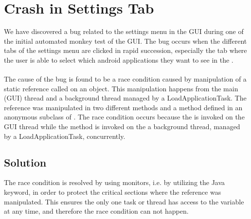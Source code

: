 \section{Crash in Settings Tab}
\label{sec:crash_in_settings_tab}

We have discovered a bug related to the settings menu in the \launcher GUI during one of the initial automated monkey test of the GUI. The bug occurs when the different tabs of the settings menu are clicked in rapid succession, especially the tab where the user is able to select which android applications they want to see in the \giraf \launcher.
\\\\
The cause of the bug is found to be a race condition caused by manipulation of a static reference called  on an  object. This manipulation happens from the main (GUI) thread and a background thread managed by a LoadApplicationTask. The reference was manipulated in two different methods  and a method  defined in an anonymous subclass of . The race condition occurs because the  is invoked on the GUI thread while the  method is invoked on the a background thread, managed by a LoadApplicationTask, concurrently.   

\subsection{Solution}
\label{sub:crash_in_settings_tab_solution}
The race condition is resolved by using monitors, i.e. by utilizing the  Java keyword, in order to protect the critical sections where the  reference was manipulated. This ensures the only one task or thread has access to the variable at any time, and therefore the race condition can not happen.



